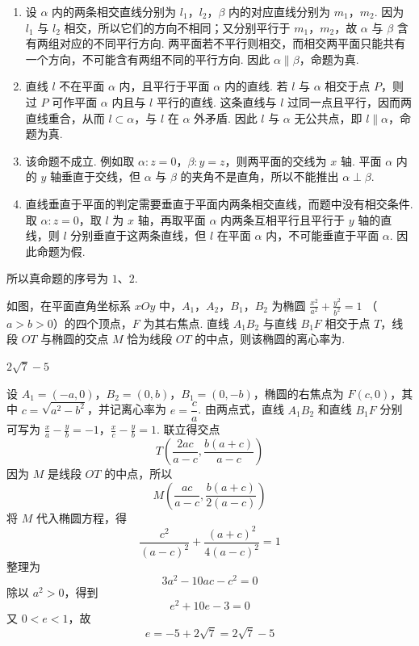 \begin{solution}
\begin{enumerate}
\item 设 \(\alpha\) 内的两条相交直线分别为 \(l_1\)，\(l_2\)，\(\beta\) 内的对应直线分别为 \(m_1\)，\(m_2\). 因为 \(l_1\) 与 \(l_2\) 相交，所以它们的方向不相同；又分别平行于 \(m_1\)，\(m_2\)，故 \(\alpha\) 与 \(\beta\) 含有两组对应的不同平行方向. 两平面若不平行则相交，而相交两平面只能共有一个方向，不可能含有两组不同的平行方向. 因此 \(\alpha\parallel\beta\)，命题为真.

\item 直线 \(l\) 不在平面 \(\alpha\) 内，且平行于平面 \(\alpha\) 内的直线. 若 \(l\) 与 \(\alpha\) 相交于点 \(P\)，则过 \(P\) 可作平面 \(\alpha\) 内且与 \(l\) 平行的直线. 这条直线与 \(l\) 过同一点且平行，因而两直线重合，从而 \(l\subset\alpha\)，与 \(l\) 在 \(\alpha\) 外矛盾. 因此 \(l\) 与 \(\alpha\) 无公共点，即 \(l\parallel\alpha\)，命题为真.

\item 该命题不成立. 例如取 \(\alpha:z=0\)，\(\beta:y=z\)，则两平面的交线为 \(x\) 轴. 平面 \(\alpha\) 内的 \(y\) 轴垂直于交线，但 \(\alpha\) 与 \(\beta\) 的夹角不是直角，所以不能推出 \(\alpha\perp\beta\).

\item 直线垂直于平面的判定需要垂直于平面内两条相交直线，而题中没有相交条件. 取 \(\alpha:z=0\)，取 \(l\) 为 \(x\) 轴，再取平面 \(\alpha\) 内两条互相平行且平行于 \(y\) 轴的直线，则 \(l\) 分别垂直于这两条直线，但 \(l\) 在平面 \(\alpha\) 内，不可能垂直于平面 \(\alpha\). 因此命题为假.
\end{enumerate}
所以真命题的序号为 \(1\)、\(2\).
\end{solution}

\begin{problem}
如图，在平面直角坐标系 \(xOy\) 中，\(A_1\)，\(A_2\)，\(B_1\)，\(B_2\) 为椭圆 \(\frac{x^2}{a^2}+\frac{y^2}{b^2}=1\) （\(a>b>0\)）的四个顶点，\(F\) 为其右焦点. 直线 \(A_1B_2\) 与直线 \(B_1F\) 相交于点 \(T\)，线段 \(OT\) 与椭圆的交点 \(M\) 恰为线段 \(OT\) 的中点，则该椭圆的离心率为\fillinblank{}.

\end{problem}

\begin{answer}
\(2\sqrt{7}-5\)
\end{answer}

\begin{solution}
设 \(A_1=(-a,0)\)，\(B_2=(0,b)\)，\(B_1=(0,-b)\)，椭圆的右焦点为 \(F(c,0)\)，其中 \(c=\sqrt{a^2-b^2}\)，并记离心率为 \(e=\dfrac ca\). 由两点式，直线 \(A_1B_2\) 和直线 \(B_1F\) 分别可写为
\(\frac{x}{a}-\frac{y}{b}=-1\)，\(\frac{x}{c}-\frac{y}{b}=1\).
联立得交点
\[
T\left(\frac{2ac}{a-c},\frac{b(a+c)}{a-c}\right)
\]
因为 \(M\) 是线段 \(OT\) 的中点，所以
\[
M\left(\frac{ac}{a-c},\frac{b(a+c)}{2(a-c)}\right)
\]
将 \(M\) 代入椭圆方程，得
\[
\frac{c^2}{(a-c)^2}+\frac{(a+c)^2}{4(a-c)^2}=1
\]
整理为
\[
3a^2-10ac-c^2=0
\]
除以 \(a^2>0\)，得到
\[
e^2+10e-3=0
\]
又 \(0<e<1\)，故
\[
e=-5+2\sqrt7=2\sqrt7-5
\]
\end{solution}

